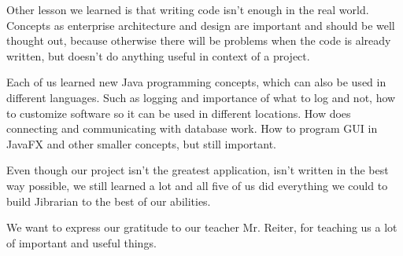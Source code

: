\documentclass[11pt,twoside,a4paper]{article}
\begin{document}
Other lesson we learned is that writing code isn't enough in the real world.
Concepts as enterprise architecture and design are important and should be well
thought out, because otherwise there will be problems when the code is already
written, but doesn't do anything useful in context of a project.

Each of us learned new Java programming concepts, which can also be used in
different languages. Such as logging and importance of what to log and not,
how to customize software so it can be used in different locations. How does
connecting and communicating with database work. How to program GUI in JavaFX
and other smaller concepts, but still important.

Even though our project isn't the greatest application, isn't written in
the best way possible, we still learned a lot and all five of us did everything
we could to build Jibrarian to the best of our abilities.

We want to express our gratitude to our teacher Mr. Reiter, for teaching us a lot
of important and useful things.



\end{document}
